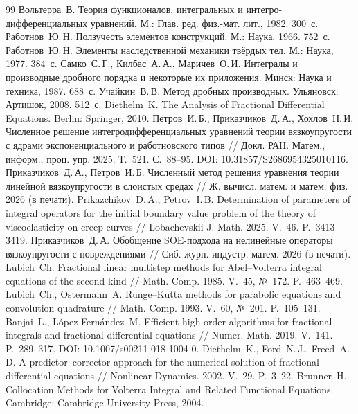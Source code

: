 \documentclass[11pt,a4paper]{article}
\theoremstyle{plain}
\theoremstyle{definition}
\begin{document}
\begin{thebibliography}{99}\small
{} Вольтерра~В. Теория функционалов, интегральных и интегро-дифференциальных уравнений. М.: Глав. ред. физ.-мат. лит., 1982. 300~с.
 Работнов~Ю.\,Н. Ползучесть элементов конструкций. М.: Наука, 1966. 752~с.
 Работнов~Ю.\,Н. Элементы наследственной механики твёрдых тел. М.: Наука, 1977. 384~с.
 Самко~С.\,Г., Килбас~А.\,А., Маричев~О.\,И. Интегралы и производные дробного порядка и некоторые их приложения. Минск: Наука и техника, 1987. 688~с.
 Учайкин~В.\,В. Метод дробных производных. Ульяновск: Артишок, 2008. 512~с.
 Diethelm~K. The Analysis of Fractional Differential Equations. Berlin: Springer, 2010.
 Петров~И.\,Б., Приказчиков~Д.\,А., Хохлов~Н.\,И. Численное решение интегродифференциальных уравнений теории вязкоупругости с ядрами экспоненциального и работновского типов // Докл. РАН. Матем., информ., проц. упр. 2025. Т.~521. С.~88--95. DOI: 10.31857/S2686954325010116.
 Приказчиков~Д.\,А., Петров~И.\,Б. Численный метод решения уравнения теории линейной вязкоупругости в слоистых средах // Ж. вычисл. матем. и матем. физ. 2026 (в печати).
 Prikazchikov~D.\,A., Petrov~I.\,B. Determination of parameters of integral operators for the initial boundary value problem of the theory of viscoelasticity on creep curves // Lobachevskii J. Math. 2025. V.~46. P.~3413--3419.
 Приказчиков~Д.\,А. Обобщение SOE-подхода на нелинейные операторы вязкоупругости с повреждениями // Сиб. журн. индустр. матем. 2026 (в печати).
 Lubich~Ch. Fractional linear multistep methods for Abel--Volterra integral equations of the second kind // Math. Comp. 1985. V.~45, №~172. P.~463--469.
 Lubich~Ch., Ostermann~A. Runge--Kutta methods for parabolic equations and convolution quadrature // Math. Comp. 1993. V.~60, №~201. P.~105--131.
 Banjai~L., L\'opez-Fern\'andez~M. Efficient high order algorithms for fractional integrals and fractional differential equations // Numer. Math. 2019. V.~141. P.~289--317. DOI: 10.1007/s00211-018-1004-0.
 Diethelm~K., Ford~N.\,J., Freed~A.\,D. A predictor--corrector approach for the numerical solution of fractional differential equations // Nonlinear Dynamics. 2002. V.~29. P.~3--22.
 Brunner~H. Collocation Methods for Volterra Integral and Related Functional Equations. Cambridge: Cambridge University Press, 2004.

\end{thebibliography}
\end{document}
